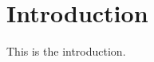 \documentclass{abntex2}
\begin{document}
\maketitle

\begin{abstract}
This is the abstract of the document.
\end{abstract}

\section{Introduction}
This is the introduction.
\end{document}
